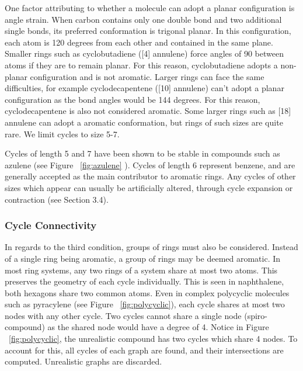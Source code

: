 \documentclass[12pt]{article}
\begin{document}
One factor attributing to whether a molecule can adopt a planar configuration is angle strain. When carbon contains only one double bond and two additional single bonds, its preferred conformation is trigonal planar. In this configuration, each atom is 120 degrees from each other and contained in the same plane. Smaller rings such as cyclobutadiene ([4] annulene) force angles of 90 between atoms if they are to remain planar. For this reason, cyclobutadiene adopts a non-planar configuration and is not aromatic. Larger rings can face the same difficulties, for example cyclodecapentene ([10] annulene) can't adopt a planar configuration as the bond angles would be 144 degrees. For this reason, cyclodecapentene is also not considered aromatic. Some larger rings such as [18] annulene can adopt a aromatic conformation, but rings of such sizes are quite rare.  We limit cycles to size 5-7. 

Cycles of length 5 and 7 have been shown to be stable in compounds such as azulene (see Figure ~\ref{fig:azulene} ). Cycles of length 6 represent benzene, and are generally accepted as the main contributor to aromatic rings. Any cycles of other sizes which appear can usually be artificially altered, through cycle expansion or contraction (see Section 3.4).

\subsubsection{Cycle Connectivity}

In regards to the third condition, groups of rings must also be considered. Instead of a single ring being aromatic, a group of rings may be deemed aromatic. In most ring systems, any two rings of a system share at most two atoms. This preserves the geometry of each cycle individually. This is seen in naphthalene, both hexagons share two common atoms. Even in complex polycyclic molecules such as pyracylene (see Figure ~\ref{fig:polycyclic}), each cycle shares at most two nodes with any other cycle. Two cycles cannot share a single node (spiro-compound) as the shared node would have a degree of 4. Notice in Figure ~\ref{fig:polycyclic}, the unrealistic compound has two cycles which share 4 nodes. To account for this, all cycles of each graph are found, and their intersections are computed. Unrealistic graphs are discarded.
\end{document}
